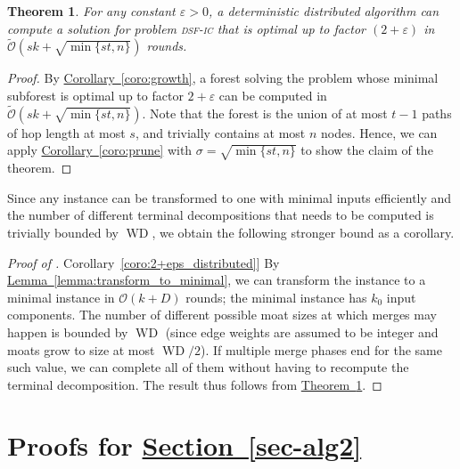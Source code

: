 \documentclass[letterpaper,11pt]{article}
\newtheorem{theorem}{Theorem}[section]
\newcommand{\namedref}[2]{\hyperref[#2]{#1~\ref*{#2}}}
\newcommand{\sectionref}[1]{\namedref{Section}{#1}}
\newcommand{\theoremref}[1]{\namedref{Theorem}{#1}}
\newcommand{\lemmaref}[1]{\namedref{Lemma}{#1}}
\newcommand{\corollaryref}[1]{\namedref{Corollary}{#1}}
\newcommand{\BO}{\mathcal{O}}
\newcommand{\sO}{\tilde{\mathcal{O}}}
\DeclareMathOperator{\WD}{WD}
\newcommand{\sfic}{\textsc{dsf-ic}\xspace}
\begin{document}
\begin{theorem}\label{theorem:2+eps_distributed}
For any constant $\varepsilon>0$, a deterministic distributed algorithm can
compute a solution for problem \sfic that is optimal up to factor
$(2+\varepsilon)$ in $\sO(sk+\sqrt{\min\{st,n\}})$ rounds.
\end{theorem}
\begin{proof}
By \corollaryref{coro:growth}, a forest solving the problem whose minimal
subforest is optimal up to factor $2+\varepsilon$ can be computed in
$\sO(sk+\sqrt{\min\{st,n\}})$. Note that the
forest is the union of at most $t-1$ paths of hop length at most $s$, and
trivially contains at most $n$ nodes. Hence, we can apply
\corollaryref{coro:prune} with $\sigma=\sqrt{\min\{st,n\}}$ to show the claim of
the theorem.
\end{proof}

Since any instance can be transformed to one with minimal inputs efficiently and
the number of different terminal decompositions that needs to be computed is
trivially bounded by $\WD$, we obtain the following stronger bound as a
corollary.

\begin{proof}[Proof of \corollaryref{coro:2+eps_distributed}]
By \lemmaref{lemma:transform_to_minimal}, we can transform the instance to a
minimal instance in $\BO(k+D)$ rounds; the minimal instance has $k_0$ input
components. The number of different possible moat sizes at which merges may
happen is bounded by $\WD$ (since edge weights are assumed to be integer and
moats grow to size at most $\WD/2$). If multiple merge phases end for the same
such value, we can complete all of them without having to recompute the terminal
decomposition. The result thus follows from
\theoremref{theorem:2+eps_distributed}.
\end{proof}


\section{Proofs for \texorpdfstring{\sectionref{sec-alg2}}{Section
\ref*{sec-alg2}}}
\end{document}
